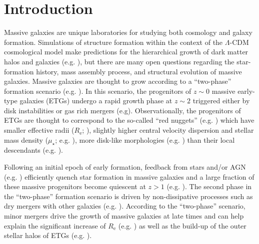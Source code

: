 \documentclass[a4paper,fleqn,usenatbib]{mnras}
\def\mden{{$\mu_{\star}$}}
\begin{document}
\section{Introduction}
    \label{sec:intro}

    Massive galaxies are unique laboratories for studying both cosmology and galaxy 
    formation. 
    Simulations of structure formation within the context of the $\Lambda$-CDM 
    cosmological model make predictions for the hierarchical growth of dark matter halos 
    and galaxies (e.g. \citealt{Baugh1996, DeLucia2006}), but there are many open 
    questions regarding the star-formation history, mass assembly process, and 
    structural evolution of massive galaxies. 
    Massive galaxies are thought to grow according to a ``two-phase'' formation scenario 
    (e.g. \citealt{Oser2010, Oser2012}). 
    In this scenario, the progenitors of $z\sim 0$ massive early-type galaxies (ETGs) 
    undergo a rapid growth phase at $z\sim 2$ triggered either by disk instabilities 
    or gas rich mergers (e.g\citealt{Hopkins2008, Dekel2009}). 
    Observationally, the progenitors of ETGs are thought to correspond to the so-called 
    ``red nuggets'' (e.g. \citealt{Damjanov2009}) which have smaller effective radii 
    ($R_{\mathrm{e}}$; \citealt{Trujillo2006, vanDokkum2008, Cimatti2008}), 
    slightly higher central velocity dispersion and stellar mass density 
    (\mden{}; e.g. \citealt{vandeSande2011, Belli2014}), more disk-like morphologies 
    (e.g. \citealt{vanderWel2011}) than their local descendants 
    (e.g. \citealt{Bezanson2009, vanDokkum2010}).
    
    Following an initial epoch of early formation, feedback from stars and/or AGN 
    (e.g. \citealt{Sijacki2007, Fabian2012}) efficiently quench star formation in 
    massive galaxies and a large fraction of these massive progenitors become quiescent 
    at $z>1$ (e.g. \citealt{Bezanson2009, Kriek2016}). 
    The second phase in the ``two-phase'' formation scenario is driven by 
    non-dissipative processes such as dry mergers with other galaxies 
    (e.g. \citealt{Naab2006, Khochfar2006}). 
    According to the ``two-phase'' scenario, minor mergers drive the growth of massive 
    galaxies at late times and can help explain the significant increase
    of $R_{\mathrm{e}}$ (e.g. \citealt{Newman2012, vdWel2014}) as well as the build-up 
    of the outer stellar halos of ETGs (e.g.  \citealt{Szomoru2012, Patel2013}).         
   
\end{document}

